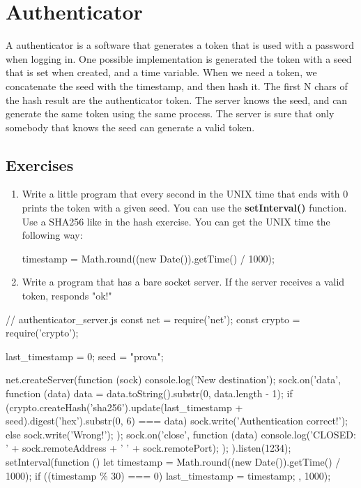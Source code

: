 \section{Authenticator}
A authenticator is a software that generates a token that is used with a password when logging in. One possible implementation is generated the token with a seed that is set when created, and a time variable. When we need a token, we concatenate the seed with the timestamp, and then hash it. The first N chars of the hash result are the authenticator token. The server knows the seed, and can generate the same token using the same process. The server is sure that only somebody that knows the seed can generate a valid token.

\subsection{Exercises}
\begin{enumerate}
\item Write a little program that every second in the UNIX time that ends with 0 prints the token with a given seed. You can use the \textbf{setInterval()} function. Use a SHA256 like in the hash exercise. You can get the UNIX time the following way:
\begin{js}
timestamp = Math.round((new Date()).getTime() / 1000);
\end{js}
\item Write a program that has a bare socket server. If the server receives a valid token, responds "ok!" 
\end{enumerate}



\begin{js}
// authenticator\_server.js
const net = require('net');
const crypto = require('crypto');

last_timestamp = 0;
seed = "prova";

net.createServer(function (sock) {
    console.log('New destination');
    sock.on('data', function (data) {
        data = data.toString().substr(0, data.length - 1);
        if (crypto.createHash('sha256').update(last_timestamp + seed).digest('hex').substr(0, 6) === data) {
            sock.write('Authentication correct!\n');
        }
        else {
            sock.write('Wrong!\n');
        }
    });
    sock.on('close', function (data) {
        console.log('CLOSED: ' + sock.remoteAddress + ' ' + sock.remotePort);
    });
}).listen(1234);
setInterval(function () {
    let timestamp = Math.round((new Date()).getTime() / 1000);
    if ((timestamp \% 30) === 0) {
        last_timestamp = timestamp;
    }
}, 1000);
\end{js}
